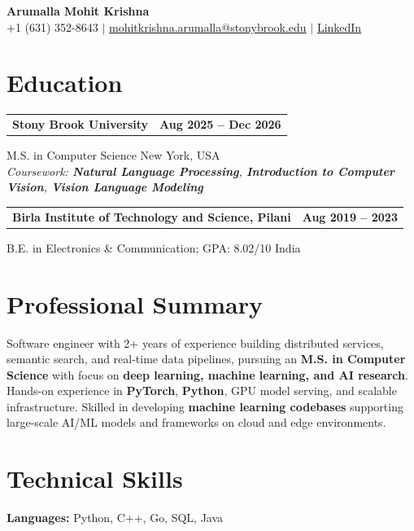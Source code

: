 \documentclass[letterpaper,10pt]{article}
\makeatletter
\newcommand{\entry}[2]{%
  \noindent
  \begin{tabularx}{\linewidth}
    {@{}>{\raggedright\arraybackslash}X@{\hspace{6pt}}r@{}}
    \textbf{#1} & #2
  \end{tabularx}\par
}
\makeatother
\begin{document}
\begin{center}
    {\LARGE\bfseries Arumalla Mohit Krishna}\\[3pt]
    +1 (631) 352-8643 $|$
    \href{mailto:mohitkrishna.arumalla@stonybrook.edu}
    {mohitkrishna.arumalla@stonybrook.edu} $|$
    \href{https://linkedin.com/in/mohit-krishna-arumalla}
    {LinkedIn}
\end{center}
\vspace{-8pt}

\section{Education}

\entry
  {\textbf{Stony Brook University}}
  {\textbf{Aug 2025 -- Dec 2026}}

M.S. in Computer Science \hfill New York, USA\\
\textit{
Coursework: \textbf{Natural Language Processing}, \textbf{Introduction to Computer Vision}, \textbf{Vision Language Modeling}
}
\vspace{3pt}

\entry
  {\textbf{Birla Institute of Technology and Science, Pilani}}
  {\textbf{Aug 2019 -- 2023}}

B.E. in Electronics \& Communication; GPA: 8.02/10 \hfill India
\section{Professional Summary}

Software engineer with 2+ years of experience building distributed services,
semantic search, and real-time data pipelines, pursuing an \textbf{M.S. in Computer Science} with focus on \textbf{deep learning, machine learning, and AI research}. Hands-on experience in \textbf{PyTorch}, \textbf{Python}, GPU model serving, and scalable infrastructure. Skilled in developing \textbf{machine learning codebases} supporting large-scale AI/ML models and frameworks on cloud and edge environments.

\section{Technical Skills}

\textbf{Languages:}
Python, C++, Go, SQL, Java\\
\end{document}
